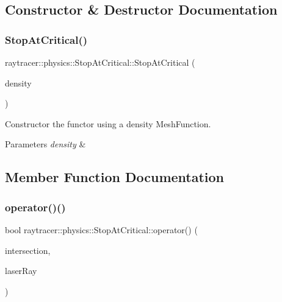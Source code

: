 \subsection{Constructor \& Destructor Documentation}
\mbox{\label{structraytracer_1_1physics_1_1StopAtCritical_adf3b3635cbe76fb2f9a079c27e31f430}} 
\subsubsection{\texorpdfstring{Stop\+At\+Critical()}{StopAtCritical()}}
{\footnotesize\ttfamily raytracer\+::physics\+::\+Stop\+At\+Critical\+::\+Stop\+At\+Critical (\begin{DoxyParamCaption}\item[{const \hyperlink{classraytracer_1_1geometry_1_1MeshFunction}{geometry\+::\+Mesh\+Function} \&}]{density }\end{DoxyParamCaption})\hspace{0.3cm}{\ttfamily [explicit]}}



Constructor the functor using a density Mesh\+Function. 


\begin{DoxyParams}{Parameters}
{\em density} & \\
\hline
\end{DoxyParams}


\subsection{Member Function Documentation}
\mbox{\label{structraytracer_1_1physics_1_1StopAtCritical_a54e6eb47a50e7448e997444647a900be}} 
\subsubsection{\texorpdfstring{operator()()}{operator()()}}
{\footnotesize\ttfamily bool raytracer\+::physics\+::\+Stop\+At\+Critical\+::operator() (\begin{DoxyParamCaption}\item[{const \hyperlink{structraytracer_1_1geometry_1_1Intersection}{geometry\+::\+Intersection} \&}]{intersection,  }\item[{const \hyperlink{structraytracer_1_1physics_1_1LaserRay}{Laser\+Ray} \&}]{laser\+Ray }\end{DoxyParamCaption})}



